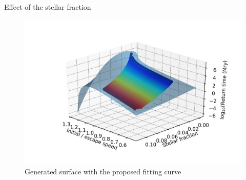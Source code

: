 \documentclass[handout]{beamer}
\begin{document}
\begin{frame}{Effect of the stellar fraction}
	\begin{figure}[h]
		\centering
		\includegraphics[width=0.8\linewidth]{"../Files/Week 10/surface"}
		\caption{Generated surface with the proposed fitting curve}
	\end{figure}
\end{frame}
\end{document}
